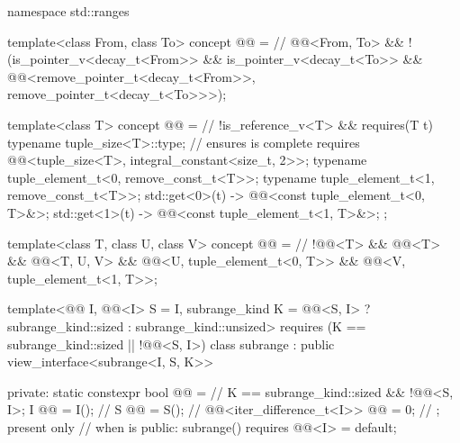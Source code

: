 %
\begin{codeblock}
namespace std::ranges {
  template<class From, class To>
    concept @@ =                    // \expos
      @@<From, To> &&
      !(is_pointer_v<decay_t<From>> &&
        is_pointer_v<decay_t<To>> &&
        @@<remove_pointer_t<decay_t<From>>, remove_pointer_t<decay_t<To>>>);

  template<class T>
    concept @@ =                                     // \expos
      !is_reference_v<T> && requires(T t) {
        typename tuple_size<T>::type;                       // ensures  is complete
        requires @@<tuple_size<T>, integral_constant<size_t, 2>>;
        typename tuple_element_t<0, remove_const_t<T>>;
        typename tuple_element_t<1, remove_const_t<T>>;
        { std::get<0>(t) } -> @@<const tuple_element_t<0, T>&>;
        { std::get<1>(t) } -> @@<const tuple_element_t<1, T>&>;
      };

  template<class T, class U, class V>
    concept @@ =                    // \expos
      !@@<T> && @@<T> &&
      @@<T, U, V> &&
      @@<U, tuple_element_t<0, T>> &&
      @@<V, tuple_element_t<1, T>>;

  template<@@ I, @@<I> S = I, subrange_kind K =
      @@<S, I> ? subrange_kind::sized : subrange_kind::unsized>
    requires (K == subrange_kind::sized || !@@<S, I>)
  class subrange : public view_interface<subrange<I, S, K>> {
  private:
    static constexpr bool @@ =                       // \expos
      K == subrange_kind::sized && !@@<S, I>;
    I @@ = I();                                         // \expos
    S @@ = S();                                           // \expos
    @@<iter_difference_t<I>> @@ = 0;   // \expos; present only
                                                            // when  is 
  public:
    subrange() requires @@<I> = default;

}}
\end{codeblock}
